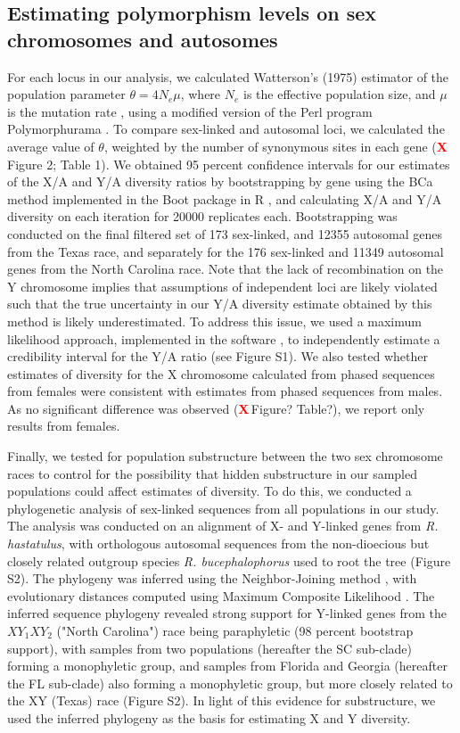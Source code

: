 \documentclass[9pt,twocolumn,twoside]{gsajnl}
\newcommand{\X}{\textcolor{red}{\bf X\,}}
\begin{document}
\subsection*{Estimating polymorphism levels on sex chromosomes and autosomes}
For each locus in our analysis, we calculated Watterson’s (1975) estimator of the population parameter $\theta=4N_{e}\mu$, where $N_{e}$ is the effective population size, and $\mu$ is the mutation rate \citep{watterson1975}, using a modified version of the Perl program Polymorphurama \citep{bachtrog2006}. To compare sex-linked and autosomal loci, we calculated the average value of $\theta$, weighted by the number of synonymous sites in each gene (\X Figure 2; Table 1). We obtained 95 percent confidence intervals for our estimates of the X/A and Y/A diversity ratios by bootstrapping by gene using the BCa method \citep{efron1994} implemented in the Boot package in R \citep{canty2012boot}, and calculating X/A and Y/A diversity on each iteration for 20000 replicates each. Bootstrapping was conducted on the final filtered set of 173 sex-linked, and 12355 autosomal genes from the Texas race, and separately for the 176 sex-linked and 11349 autosomal genes from the North Carolina race. Note that the lack of recombination on the Y chromosome implies that assumptions of independent loci are likely violated such that the true uncertainty in our Y/A diversity estimate obtained by this method is likely underestimated. To address this issue, we used a maximum likelihood approach, implemented in the software \citep{wright2004hka}, to independently estimate a credibility interval for the Y/A ratio (see Figure S1). We also tested whether estimates of diversity for the X chromosome calculated from phased sequences from females were consistent with estimates from phased sequences from males. As no significant difference was observed (\X Figure? Table?), we report only results from females.

Finally, we tested for population substructure between the two sex chromosome races to control for the possibility that hidden substructure in our sampled populations could affect estimates of diversity. To do this, we conducted a phylogenetic analysis of sex-linked sequences from all populations in our study. The analysis was conducted on an alignment of X- and Y-linked genes from \textit{R. hastatulus}, with orthologous autosomal sequences from the non-dioecious but closely related outgroup species \textit{R. bucephalophorus} used to root the tree (Figure S2). The phylogeny was inferred using the Neighbor-Joining method \citep{saitou1987neighbor}, with evolutionary distances computed using Maximum Composite Likelihood \citep{tamura2011mega5}. The inferred sequence phylogeny revealed strong support for Y-linked genes from the $XY_{1}XY_{2}$ ("North Carolina") race being paraphyletic (98 percent bootstrap support), with samples from two populations (hereafter the SC sub-clade) forming a monophyletic group, and samples from Florida and Georgia (hereafter the FL sub-clade) also forming a monophyletic group, but more closely related to the XY (Texas) race (Figure S2). In light of this evidence for substructure, we used the inferred phylogeny as the basis for estimating X and Y diversity.  
\end{document}
